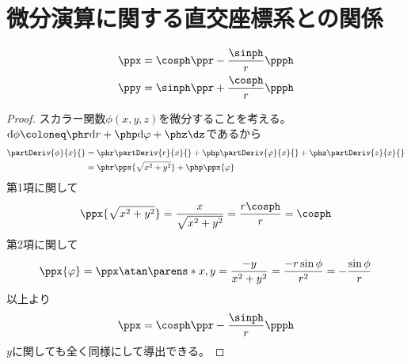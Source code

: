     \section{微分演算に関する直交座標系との関係}
        \begin{shadebox}
            \begin{align*}
                \ppx &= \cosph\ppr - \frac{\sinph}{r}\ppph\\
                \ppy &= \sinph\ppr + \frac{\cosph}{r}\ppph
            \end{align*}
        \end{shadebox}
        \begin{proof}
            スカラー関数$\phi(x,y,z)$を微分することを考える。
            $\mathrm{d}\phi \coloneq \phr \mathrm{d}r + \php \mathrm{d}\varphi + \phz \dz$であるから
            \begin{align*}
                \partDeriv{\phi}{x}{} &= \phr\partDeriv{r}{x}{} + \php\partDeriv{\varphi}{x}{} + \phz\partDeriv{z}{x}{}\\
                &= \phr\ppx{\sqrt{x^2+y^2}} + \php\ppx{\varphi}
            \end{align*}
            第1項に関して
            \[\ppx{\sqrt{x^2+y^2}} = \frac{x}{\sqrt{x^2+y^2}} = \frac{r\cosph}{r} = \cosph\]
            第2項に関して
            \[\ppx{\varphi} = \ppx\atan\parens*{x,y} = \frac{-y}{x^2+y^2} = \frac{-r\sin{\phi}}{r^2} = -\frac{\sin{\phi}}{r}\]
            以上より
            \[\ppx = \cosph\ppr - \frac{\sinph}{r}\ppph\]
            $y$に関しても全く同様にして導出できる。
        \end{proof}